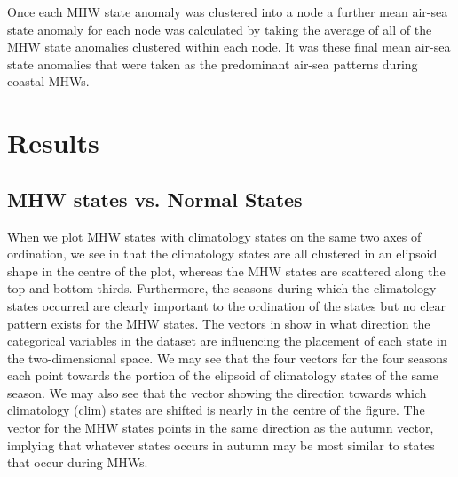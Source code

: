 \documentclass[a4paper,10pt,review]{elsarticle}
\begin{document}
Once each MHW state anomaly was clustered into a node a further mean air-sea state anomaly for each node was calculated by taking the average of all of the MHW state anomalies clustered within each node. It was these final mean air-sea state anomalies that were taken as the predominant air-sea patterns during coastal MHWs.

\section{Results}
\subsection{MHW states vs. Normal States}
When we plot MHW states with climatology states on the same two axes of ordination, we see in  that the climatology states are all clustered in an elipsoid shape in the centre of the plot, whereas the MHW states are scattered along the top and bottom thirds. Furthermore, the seasons during which the climatology states occurred are clearly important to the ordination of the states but no clear pattern exists for the MHW states. The vectors in  show in what direction the categorical variables in the dataset are influencing the placement of each state in the two-dimensional space. We may see that the four vectors for the four seasons each point towards the portion of the elipsoid of climatology states of the same season. We may also see that the vector showing the direction towards which climatology (clim) states are shifted is nearly in the centre of the figure. The vector for the MHW states points in the same direction as the autumn vector, implying that whatever states occurs in autumn may be most similar to states that occur during MHWs.
\end{document}
